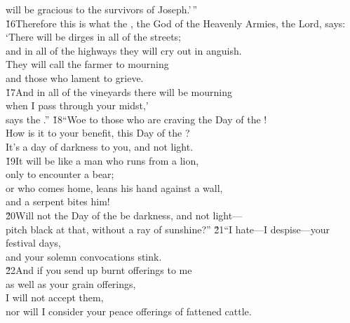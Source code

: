 \begin{poetry}
\poeml will be gracious to the survivors of Joseph.'\,'' \\
\poeml \v{16}Therefore this is what the , the God of the Heavenly Armies, the Lord, says: \\
\poeml `There will be dirges in all of the streets; \\
\poemlll       and in all of the highways they will cry out in anguish. \\
\poeml They will call the farmer to mourning \\
\poemll    and those who lament to grieve. \\
\poeml \v{17}And in all of the vineyards there will be mourning \\
\poemll    when I pass through your midst,' \\
\poemlll       says the .''
\poeml \v{18}``Woe to those who are craving the Day of the ! \\
\poemll    How is it to your benefit, this Day of the ? \\
\poemlll       It's a day of darkness to you, and not light. \\
\poeml \v{19}It will be like a man who runs from a lion, \\
\poemll    only to encounter a bear; \\
\poeml or who comes home, leans his hand against a wall, \\
\poemll    and a serpent bites him! \\
\poeml \v{20}Will not the Day of the  be darkness, and not light--- \\
\poemll    pitch black at that, without a ray of sunshine?''
\poeml \v{21}``I hate---I despise---your festival days, \\
\poemll    and your solemn convocations stink. \\
\poeml \v{22}And if you send up burnt offerings to me \\
\poemll    as well as your grain offerings, \\
\poeml I will not accept them, \\
\poemll    nor will I consider your peace offerings of fattened cattle. \\

\end{poetry}
